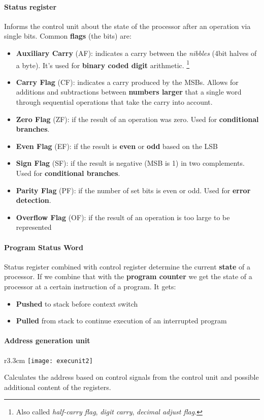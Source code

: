 \paragraph{Status register}
Informs the control unit about the state of the processor after an operation via single bits. Common \textbf{flags} (the bits) are:
\begin{itemize}
	\item \textbf{Auxiliary Carry} (AF): indicates a carry between the \textit{nibbles} (4bit halves of a byte). It's used for \textbf{binary coded digit} arithmetic. \footnote{Also called \textit{half-carry flag}, \textit{digit carry}, \textit{decimal adjust flag}.} 
	\item \textbf{Carry Flag} (CF): indicates a carry produced by the MSBs. Allows for additions and subtractions between \textbf{numbers larger} that a single word through sequential operations that take the carry into account.
	\item \textbf{Zero Flag} (ZF): if the result of an operation was zero. Used for \textbf{conditional branches}.
	\item \textbf{Even Flag} (EF): if the result is \textbf{even} or \textbf{odd} based on the LSB
	\item \textbf{Sign Flag} (SF): if the result is negative (MSB is 1) in two complements. Used for \textbf{conditional branches}.
	\item \textbf{Parity Flag} (PF): if the number of set bits is even or odd. Used for \textbf{error detection}.
	\item \textbf{Overflow Flag} (OF): if the result of an operation is too large to be represented 
\end{itemize}

\paragraph{Program Status Word}
Status register combined with control register determine the current \textbf{state} of a processor. If we combine that with the \textbf{program counter} we get the state of a processor at a certain instruction of a program. It gets:
\begin{itemize}
	\item \textbf{Pushed} to stack before context switch
	\item \textbf{Pulled} from stack to continue execution of an interrupted program
\end{itemize}

\paragraph{Address generation unit}
\begin{wrapfigure}[3]{r}{3.3cm}
	\vspace{-0.5cm}
	\texttt{[image: execunit2]}
\end{wrapfigure}
Calculates the address based on control signals from the control unit and possible additional content of the registers.

